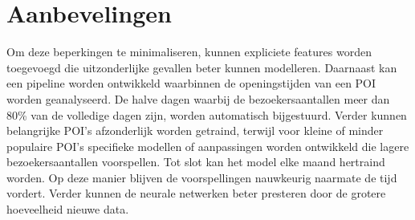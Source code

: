 \section{Aanbevelingen}
Om deze beperkingen te minimaliseren, kunnen expliciete features worden toegevoegd die uitzonderlijke gevallen beter kunnen modelleren. Daarnaast kan een pipeline worden ontwikkeld waarbinnen de openingstijden van een POI worden geanalyseerd. De halve dagen waarbij de bezoekersaantallen meer dan 80\% van de volledige dagen zijn, worden automatisch bijgestuurd. Verder kunnen belangrijke POI’s afzonderlijk worden getraind, terwijl voor kleine of minder populaire POI’s specifieke modellen of aanpassingen worden ontwikkeld die lagere bezoekersaantallen voorspellen. Tot slot kan het model elke maand hertraind worden. Op deze manier blijven de voorspellingen nauwkeurig naarmate de tijd vordert. Verder kunnen de neurale netwerken beter presteren door de grotere hoeveelheid nieuwe data.
